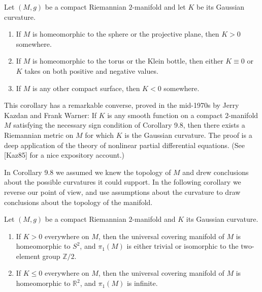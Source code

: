 \begin{corollary}
\label{cor:gaussian-curvature-and-topology}
Let $(M,g)$ be a compact Riemannian $2$-manifold and let $K$ be its Gaussian curvature.

\begin{enumerate}
\item[(a)] If $M$ is homeomorphic to the sphere or the projective plane, then $K > 0$ somewhere.
\item[(b)] If $M$ is homeomorphic to the torus or the Klein bottle, then either $K \equiv 0$ or $K$ takes on both positive and negative values.
\item[(c)] If $M$ is any other compact surface, then $K < 0$ somewhere.
\end{enumerate}
\end{corollary}

This corollary has a remarkable converse, proved in the mid-1970s by Jerry Kazdan and Frank Warner: If $K$ is any smooth function on a compact $2$-manifold $M$ satisfying the necessary sign condition of Corollary 9.8, then there exists a Riemannian metric on $M$ for which $K$ is the Gaussian curvature. The proof is a deep application of the theory of nonlinear partial differential equations. (See [Kaz85] for a nice expository account.)

In Corollary 9.8 we assumed we knew the topology of $M$ and drew conclusions about the possible curvatures it could support. In the following corollary we reverse our point of view, and use assumptions about the curvature to draw conclusions about the topology of the manifold.

\begin{corollary}
\label{cor:curvature-determines-cover}
Let $(M,g)$ be a compact Riemannian $2$-manifold and $K$ its Gaussian curvature.

\begin{enumerate}
\item[(a)] If $K > 0$ everywhere on $M$, then the universal covering manifold of $M$ is homeomorphic to $S^2$, and $\pi_1(M)$ is either trivial or isomorphic to the two-element group $\mathbb{Z}/2$.
\item[(b)] If $K \le 0$ everywhere on $M$, then the universal covering manifold of $M$ is homeomorphic to $\mathbb{R}^2$, and $\pi_1(M)$ is infinite.
\end{enumerate}
\end{corollary}

